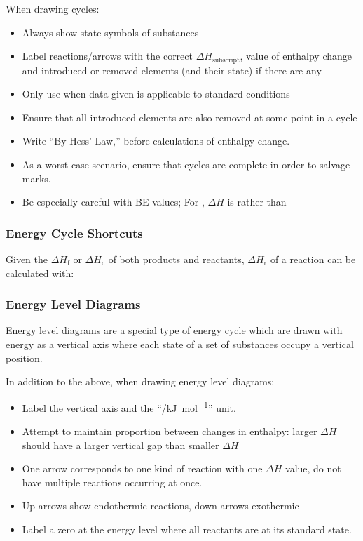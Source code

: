 \documentclass[../main]{subfiles}
\begin{document}
	When drawing cycles:
	\begin{itemize}
		\item Always show state symbols of substances
		\item Label reactions/arrows with the correct \(\Delta H_\text{subscript}\), value of enthalpy change and introduced or removed elements (and their state) if there are any
		\item Only use \plimsoll when data given is applicable to standard conditions
		\item Ensure that all introduced elements are also removed at some point in a cycle
		\item Write ``By Hess' Law,'' before calculations of enthalpy change.
		\item As a worst case scenario, ensure that cycles are complete in order to salvage marks.
		\item Be especially careful with BE values; For , \(\Delta H\) is  rather than 
	\end{itemize}

	\subsubsection{Energy Cycle Shortcuts}

	Given the \(\Delta H_\text{f}\) or \(\Delta H_\text{c}\) of both products and reactants, \(\Delta H_\text{r}\) of a reaction can be calculated with:


	\subsubsection{Energy Level Diagrams}

	Energy level diagrams are a special type of energy cycle which are drawn with energy as a vertical axis where each state of a set of substances occupy a vertical position.

	In addition to the above, when drawing energy level diagrams:
	\begin{itemize}
		\item Label the vertical axis and the ``/\si{\kJ\per\mol}'' unit.
		\item Attempt to maintain proportion between changes in enthalpy: larger \(\Delta H\) should have a larger vertical gap than smaller \(\Delta H\)
		\item One arrow corresponds to one kind of reaction with one \(\Delta H\) value, do not have multiple reactions occurring at once.
		\item Up arrows show endothermic reactions, down arrows exothermic
		\item Label a zero at the energy level where all reactants are at its standard state.
	\end{itemize}
\end{document}
